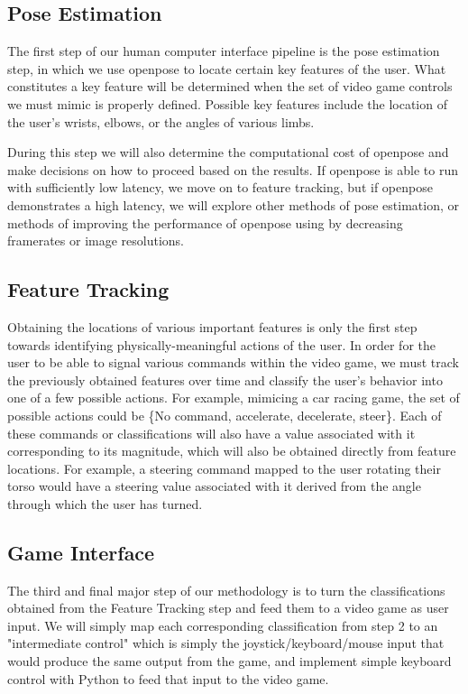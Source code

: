 \documentclass[10pt,twocolumn,letterpaper]{article}
\begin{document}
\subsection{Pose Estimation}
The first step of our human computer interface pipeline is the pose estimation step, in which 
we use openpose to locate certain key features of the user. What constitutes a key feature will 
be determined when the set of video game controls we must mimic is properly defined. Possible 
key features include the location of the user's wrists, elbows, or the angles of various limbs. 

During this step we will also determine the computational cost of openpose and make decisions on 
how to proceed based on the results. If openpose is able to run with sufficiently low latency, we 
move on to feature tracking, but if openpose demonstrates a high latency, we will explore other 
methods of pose estimation, or methods of improving the performance of openpose using by decreasing 
framerates or image resolutions.

\subsection{Feature Tracking}
Obtaining the locations of various important features is only the first step towards identifying 
physically-meaningful actions of the user. In order for the user to be able to signal various 
commands within the video game, we must track the previously obtained features over time and 
classify the user's behavior into one of a few possible actions. For example, mimicing a car 
racing game, the set of possible actions could be \{No command, accelerate, decelerate, steer\}. 
Each of these commands or classifications will also have a value associated with it corresponding 
to its magnitude, which will also be obtained directly from feature locations. For example, a steering 
command mapped to the user rotating their torso would have a steering value associated with it 
derived from the angle through which the user has turned. 

\subsection{Game Interface}
The third and final major step of our methodology is to turn the classifications obtained from 
the Feature Tracking step and feed them to a video game as user input. We will simply map each 
corresponding classification from step 2 to an "intermediate control" which is simply the 
joystick/keyboard/mouse input that would produce the same output from the game, and implement 
simple keyboard control with Python to feed that input to the video game.
\end{document}
